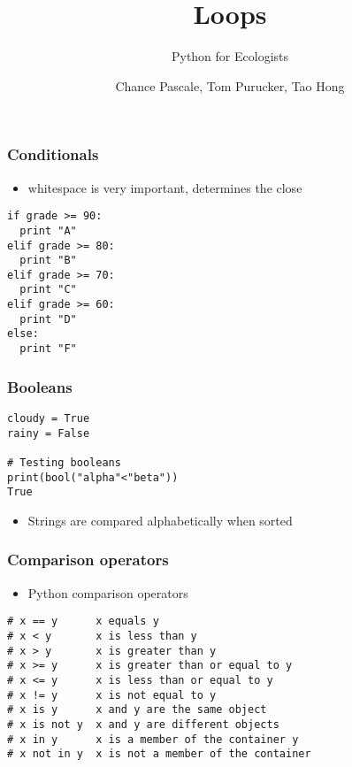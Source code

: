 \documentclass{beamer}
\title[Title1]{Loops}
\subtitle[Title2]{Python for Ecologists}
\author[etal]{Chance Pascale, Tom Purucker, Tao Hong}
\institute[EPA]{
  Ecological Society of America Workshop\\
  Portland, OR\\[1ex]
  \texttt{purucker.tom@gmail.com}
}
\newcommand\Fontvi{\fontsize{6}{7.2}\selectfont}
\begin{document}
\begin{frame}[plain]
  \titlepage
\end{frame}




\begin{frame}[fragile]
\frametitle{Conditionals}
\begin{itemize}
\item whitespace is very important, determines the close
\end{itemize}
\begin{lstlisting}
if grade >= 90:
  print "A"
elif grade >= 80:
  print "B"
elif grade >= 70:
  print "C"
elif grade >= 60:
  print "D"
else:
  print "F"  
\end{lstlisting} 
\end{frame}

\begin{frame}[fragile]
\frametitle{Booleans}
\begin{lstlisting}
cloudy = True
rainy = False

# Testing booleans
print(bool("alpha"<"beta"))
True
\end{lstlisting}
\begin{itemize}
\item Strings are compared alphabetically when sorted
\end{itemize}
\end{frame}

\begin{frame}[fragile]
\frametitle{Comparison operators}
\begin{itemize}
\item Python comparison operators
\end{itemize}
\begin{lstlisting}
# x == y      x equals y
# x < y       x is less than y
# x > y       x is greater than y
# x >= y      x is greater than or equal to y
# x <= y      x is less than or equal to y
# x != y      x is not equal to y
# x is y      x and y are the same object
# x is not y  x and y are different objects
# x in y      x is a member of the container y
# x not in y  x is not a member of the container
\end{lstlisting}
\end{frame}
\end{document}
